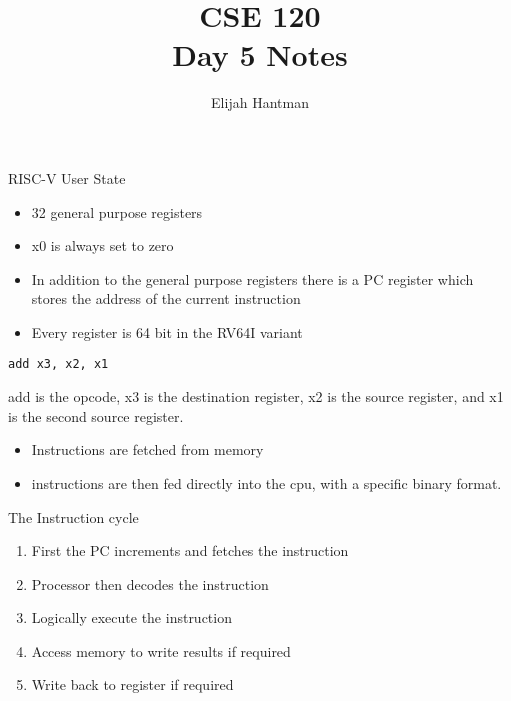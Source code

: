 \documentclass{report}
\title{\Huge{CSE 120}\\Day 5 Notes}
\author{\huge{Elijah Hantman}}
\date{}
\begin{document}
\maketitle
\newpage

\begin{description}
    \item {\large RISC-V User State}
        \begin{mdframed}
            \begin{itemize}
                \item 32 general purpose registers
                \item x0 is always set to zero
                \item In addition to the general purpose registers there is a
                    PC register which stores the address of the current instruction
                \item Every register is 64 bit in the RV64I variant
            \end{itemize}

            \begin{lstlisting}[language = {[x86asm]Assembler}]
            add x3, x2, x1
        \end{lstlisting}

        add is the opcode, x3 is the destination register,
        x2 is the source register, and x1 is the second source
        register.

        \begin{itemize}
            \item Instructions are fetched from memory
            \item instructions are then fed directly into the
                cpu, with a specific binary format.
        \end{itemize}

        The Instruction cycle
        \begin{enumerate}
            \item First the PC increments and fetches the instruction
            \item Processor then decodes the instruction
            \item Logically execute the instruction
            \item Access memory to write results if required
            \item Write back to register if required
        \end{enumerate}


\end{mdframed}
\end{description}
\end{document}
